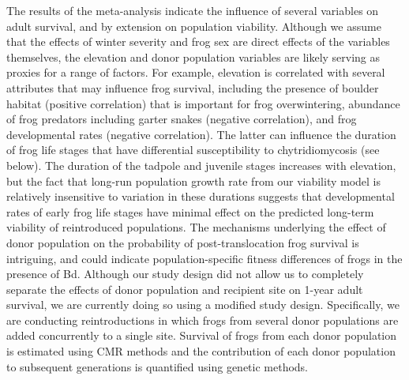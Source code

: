 \documentclass[
  letterpaper,
  DIV=11,
  numbers=noendperiod]{scrartcl}
\begin{document}
The results of the meta-analysis indicate the influence of several
variables on adult survival, and by extension on population viability.
Although we assume that the effects of winter severity and frog sex are
direct effects of the variables themselves, the elevation and donor
population variables are likely serving as proxies for a range of
factors. For example, elevation is correlated with several attributes
that may influence frog survival, including the presence of boulder
habitat (positive correlation) that is important for frog overwintering,
abundance of frog predators including garter snakes (negative
correlation), and frog developmental rates (negative correlation). The
latter can influence the duration of frog life stages that have
differential susceptibility to chytridiomycosis (see below). The
duration of the tadpole and juvenile stages increases with elevation,
but the fact that long-run population growth rate from our viability
model is relatively insensitive to variation in these durations suggests
that developmental rates of early frog life stages have minimal effect
on the predicted long-term viability of reintroduced populations. The
mechanisms underlying the effect of donor population on the probability
of post-translocation frog survival is intriguing, and could indicate
population-specific fitness differences of frogs in the presence of Bd.
Although our study design did not allow us to completely separate the
effects of donor population and recipient site on 1-year adult survival,
we are currently doing so using a modified study design. Specifically,
we are conducting reintroductions in which frogs from several donor
populations are added concurrently to a single site. Survival of frogs
from each donor population is estimated using CMR methods and the
contribution of each donor population to subsequent generations is
quantified using genetic methods.
\end{document}
